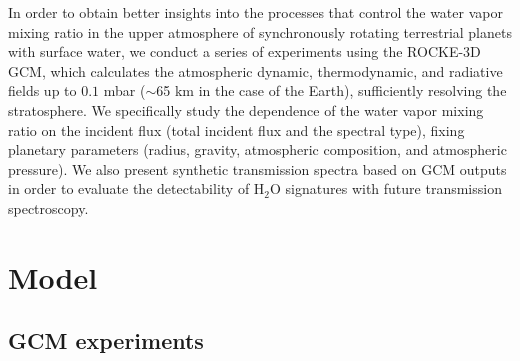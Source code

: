 \documentclass[11pt,numberedappendix,twocolappendix,]{emulateapj}
\def\water{H$_2$O}
\def\modelE{ROCKE-3D}
\def\wv{water vapor}
\newcommand{\yf}[1]{{\color{orange}#1}}
\begin{document}

\yf{In order to obtain better insights into the processes that control the \wv{}  mixing ratio in the upper atmosphere of synchronously rotating terrestrial planets with surface water, we conduct a series of experiments using the \modelE{} GCM, which calculates the atmospheric dynamic, thermodynamic, and radiative fields up to $0.1$ mbar ($\sim $65 km in the case of the Earth), sufficiently resolving the stratosphere. }
We specifically study the dependence of the \wv{} mixing ratio on the incident flux (total incident flux and the spectral type), fixing planetary parameters (radius, gravity, atmospheric composition, and atmospheric pressure). 
We also present synthetic transmission spectra based on GCM outputs in order to evaluate the detectability of \water{} signatures with future transmission spectroscopy. 



\section{Model}
\label{s:model}

\subsection{GCM experiments}
\end{document}
